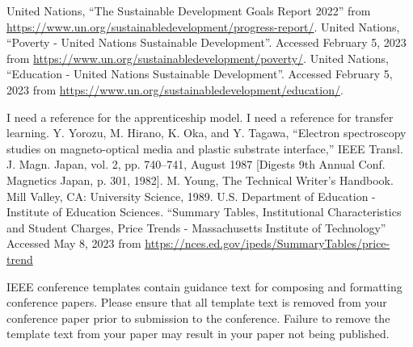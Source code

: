 \documentclass[journal, onecolumn]{IEEEtran}
\begin{document}
\begin{thebibliography}{00}
   United Nations, ``The Sustainable Development Goals Report 2022'' from \url{https://www.un.org/sustainabledevelopment/progress-report/}.
   United Nations, ``Poverty - United Nations Sustainable Development''. Accessed February 5, 2023 from \url{https://www.un.org/sustainabledevelopment/poverty/}.
   United Nations, ``Education - United Nations Sustainable Development''. Accessed February 5, 2023 from \url{https://www.un.org/sustainabledevelopment/education/}.

  
 I need a reference for the apprenticeship model.
 I need a reference for transfer learning.
 Y. Yorozu, M. Hirano, K. Oka, and Y. Tagawa, ``Electron spectroscopy studies on magneto-optical media and plastic substrate interface,'' IEEE Transl. J. Magn. Japan, vol. 2, pp. 740--741, August 1987 [Digests 9th Annual Conf. Magnetics Japan, p. 301, 1982].
 M. Young, The Technical Writer's Handbook. Mill Valley, CA: University Science, 1989.
 U.S. Department of Education - Institute of Education Sciences. ``Summary Tables, Institutional Characteristics and Student Charges, Price Trends - Massachusetts Institute of Technology'' Accessed May 8, 2023 from \url{https://nces.ed.gov/ipeds/SummaryTables/price-trend}
\end{thebibliography}
\vspace{12pt}
\color{red}
IEEE conference templates contain guidance text for composing and formatting conference papers. Please ensure that all template text is removed from your conference paper prior to submission to the conference. Failure to remove the template text from your paper may result in your paper not being published.
\end{document}
